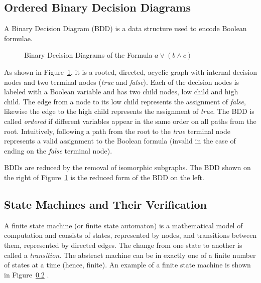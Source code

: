\subsection{Ordered Binary Decision Diagrams}
A Binary Decision Diagram (BDD) is a data structure used to encode Boolean formulae.
\begin{figure}[!htb]
        \caption{\label{fig:bdd} Binary Decision Diagrams of the Formula $a \lor (b \land c)$}
\end{figure}
As shown in Figure~\ref{fig:bdd}, it is a rooted, directed, acyclic graph with internal decision nodes and two terminal nodes (\textit{true} and \textit{false}). Each of the decision nodes is labeled with a Boolean variable and has two child nodes, low child and high child. The edge from a node to its low child represents the assignment of \textit{false}, likewise the edge to the high child represents the assignment of \textit{true}. The BDD is called \textit{ordered} if different variables appear in the same order on all paths from the root. Intuitively, following a path from the root to the \textit{true} terminal node represents a valid assignment to the Boolean formula (invalid in the case of ending on the \textit{false} terminal node). 

BDDs are reduced by the removal of isomorphic subgraphs. The BDD shown on the right of Figure~\ref{fig:bdd} is the reduced form of the BDD on the left.

\subsection{State Machines and Their Verification}
A finite state machine (or finite state automaton) is a mathematical model of computation and consists of states, represented by nodes, and transitions between them, represented by directed edges. The change from one state to another is called a {\em transition}. The abstract machine can be in exactly one of a finite number of states at a time (hence, finite). An example of a finite state machine is shown in Figure~\ref{} .

